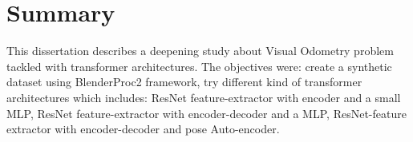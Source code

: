 
\cleardoublepage
{}
{}
\begingroup
\let\clearpage\relax
\let\cleardoublepage\relax
\let\cleardoublepage\relax

\chapter*{Summary}

%
%
This dissertation describes a deepening study about Visual Odometry problem tackled with transformer architectures.
The objectives were: create a synthetic dataset using BlenderProc2 framework, try different kind of transformer architectures which includes:
ResNet feature-extractor with encoder and a small MLP, ResNet feature-extractor with encoder-decoder and a MLP, ResNet-feature extractor with encoder-decoder and pose Auto-encoder.


\endgroup			

\vfill

